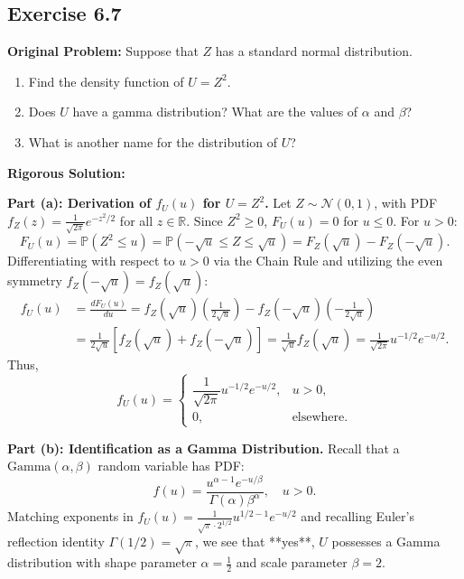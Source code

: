 \documentclass[11pt, letterpaper]{article}
\theoremstyle{definition}
\theoremstyle{remark}
\newcommand{\R}{\mathbb{R}}
\newcommand{\Prob}{\mathbb{P}}
\begin{document}
\subsection{Exercise 6.7}

\textbf{Original Problem:}
Suppose that $Z$ has a standard normal distribution.
\begin{enumerate}[label=\textbf{\alph*}]
    \item Find the density function of $U = Z^2$.
    \item Does $U$ have a gamma distribution? What are the values of $\alpha$ and $\beta$?
    \item What is another name for the distribution of $U$?
\end{enumerate}

\hrulefill

\textbf{Rigorous Solution:}

\textbf{Part (a): Derivation of $f_U(u)$ for $U = Z^2$.}
Let $Z \sim \mathcal{N}(0, 1)$, with PDF $f_Z(z) = \frac{1}{\sqrt{2\pi}}e^{-z^2/2}$ for all $z \in \R$. Since $Z^2 \ge 0$, $F_U(u) = 0$ for $u \le 0$. For $u > 0$:
\[
    F_U(u) = \Prob(Z^2 \le u) = \Prob(-\sqrt{u} \le Z \le \sqrt{u}) = F_Z(\sqrt{u}) - F_Z(-\sqrt{u}).
\]
Differentiating with respect to $u > 0$ via the Chain Rule and utilizing the even symmetry $f_Z(-\sqrt{u}) = f_Z(\sqrt{u})$:
\begin{align*}
    f_U(u) &= \frac{dF_U(u)}{du} = f_Z(\sqrt{u})\left(\frac{1}{2\sqrt{u}}\right) - f_Z(-\sqrt{u})\left(-\frac{1}{2\sqrt{u}}\right) \\
    &= \frac{1}{2\sqrt{u}} \left[ f_Z(\sqrt{u}) + f_Z(-\sqrt{u}) \right] = \frac{1}{\sqrt{u}} f_Z(\sqrt{u}) = \frac{1}{\sqrt{2\pi}} u^{-1/2} e^{-u/2}.
\end{align*}
Thus,
\[
    f_U(u) = \begin{cases} \dfrac{1}{\sqrt{2\pi}} u^{-1/2} e^{-u/2}, & u > 0, \\[6pt] 0, & \text{elsewhere.} \end{cases}
\]

\textbf{Part (b): Identification as a Gamma Distribution.}
Recall that a $\text{Gamma}(\alpha, \beta)$ random variable has PDF:
\[
    f(u) = \frac{u^{\alpha - 1} e^{-u/\beta}}{\Gamma(\alpha)\beta^\alpha}, \quad u > 0.
\]
Matching exponents in $f_U(u) = \frac{1}{\sqrt{\pi}\cdot 2^{1/2}} u^{1/2 - 1} e^{-u/2}$ and recalling Euler's reflection identity $\Gamma(1/2) = \sqrt{\pi}$, we see that **yes**, $U$ possesses a Gamma distribution with shape parameter $\alpha = \frac{1}{2}$ and scale parameter $\beta = 2$.
\end{document}
